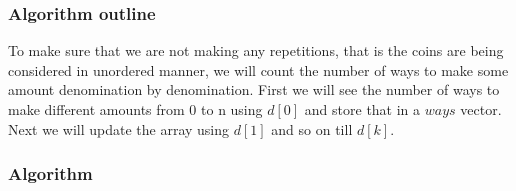 \documentclass{article}
\begin{document}
\subsubsection{Algorithm outline}
To make sure that we are not making any repetitions, that is the coins are being considered in unordered manner, we will count the number of ways to make some amount denomination by denomination. First we will see the number of ways to make different amounts from 0 to n using $d[0]$ and store that in a $ways$ vector. Next we will update the array using $d[1]$ and so on till $d[k]$.

\subsubsection{Algorithm}

\end{document}
